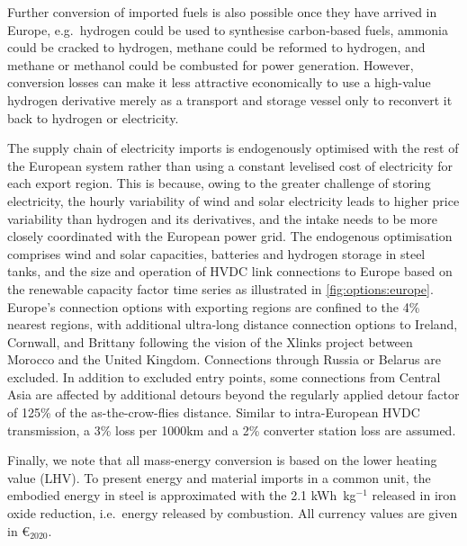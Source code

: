 
Further conversion of imported fuels is also possible once they have arrived in
Europe, e.g.~hydrogen could be used to synthesise carbon-based fuels, ammonia
could be cracked to hydrogen, methane could be reformed to hydrogen, and methane
or methanol could be combusted for power generation. However, conversion losses
can make it less attractive economically to use a high-value hydrogen derivative
merely as a transport and storage vessel only to reconvert it back to hydrogen
or electricity.


The supply chain of electricity imports is endogenously optimised with the rest
of the European system rather than using a constant levelised cost of
electricity for each export region. This is because, owing to the greater
challenge of storing electricity, the hourly variability of wind and solar
electricity leads to higher price variability than hydrogen and its derivatives,
and the intake needs to be more closely coordinated with the European power
grid. The endogenous optimisation comprises wind and solar capacities, batteries
and hydrogen storage in steel tanks, and the size and operation of HVDC link
connections to Europe based on the renewable capacity factor time series as
illustrated in \cref{fig:options:europe}. Europe's connection options with
exporting regions are confined to the 4\% nearest regions, with additional
ultra-long distance connection options to Ireland, Cornwall, and Brittany
following the vision of the Xlinks project between Morocco and the United
Kingdom.\cite{xlinksMoroccoUKPowerProject2023} Connections through Russia or
Belarus are excluded. In addition to excluded entry points, some connections
from Central Asia are affected by additional detours beyond the regularly
applied detour factor of 125\% of the as-the-crow-flies distance. Similar to
intra-European HVDC transmission, a 3\% loss per 1000km and a 2\% converter
station loss are assumed.

\vspace{1em}

Finally, we note that all mass-energy conversion is based on the lower heating
value (LHV). To present energy and material imports in a common unit, the
embodied energy in steel is approximated with the 2.1 kWh~kg$^{-1}$ released in
iron oxide reduction, i.e.~energy released by
combustion.\cite{kuhnIronRecyclable2022} All currency values are given in
\euro{}$_{2020}$.
